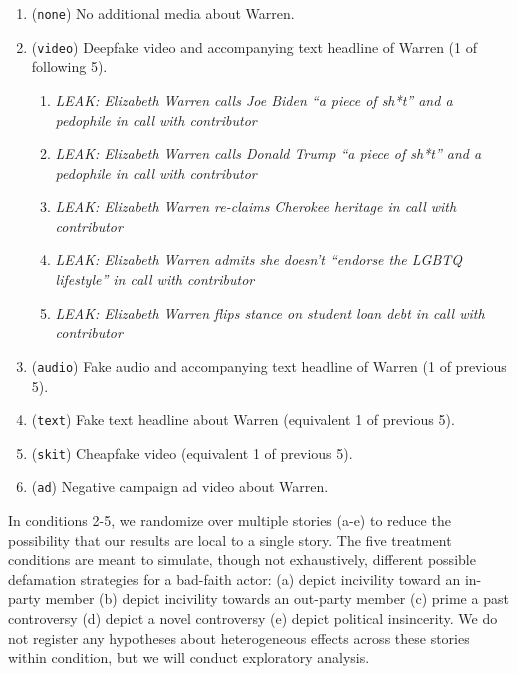 \documentclass[12pt,letterpaper]{article}
\begin{document}
{ 
\begin{enumerate}
    \item (\texttt{none}) No additional media about Warren.
    \item (\texttt{video}) Deepfake video and accompanying text headline of Warren (1 of following 5).
    \begin{enumerate}
        \item \textit{LEAK: Elizabeth Warren calls Joe Biden ``a piece of sh*t'' and a pedophile in call with contributor} \newline
        \item \textit{LEAK: Elizabeth Warren calls Donald Trump ``a piece of sh*t'' and a pedophile in call with contributor} \newline
        \item \textit{LEAK: Elizabeth Warren re-claims Cherokee heritage in call with contributor} \newline
        \item \textit{LEAK: Elizabeth Warren admits she doesn't ``endorse the LGBTQ lifestyle'' in call with contributor} \newline
        \item \textit{LEAK: Elizabeth Warren flips stance on student loan debt in call with contributor}
    \end{enumerate}
    \item (\texttt{audio}) Fake audio and accompanying text headline of Warren (1 of previous 5).
    \item (\texttt{text}) Fake text headline about Warren (equivalent 1 of previous 5).
    \item (\texttt{skit}) Cheapfake video (equivalent 1 of previous 5).
    \item (\texttt{ad}) Negative campaign ad video about Warren.
\end{enumerate}
}

\noindent In conditions 2-5, we randomize over multiple stories (a-e) to reduce the possibility that our results are local to a single story. The five treatment conditions are meant to simulate, though not exhaustively, different possible defamation strategies for a bad-faith actor: (a) depict incivility toward an in-party member (b) depict incivility towards an out-party member (c) prime a past controversy (d) depict a novel controversy (e) depict political insincerity. We do not register any hypotheses about heterogeneous effects across these stories within condition, but we will conduct exploratory analysis.
\end{document}
